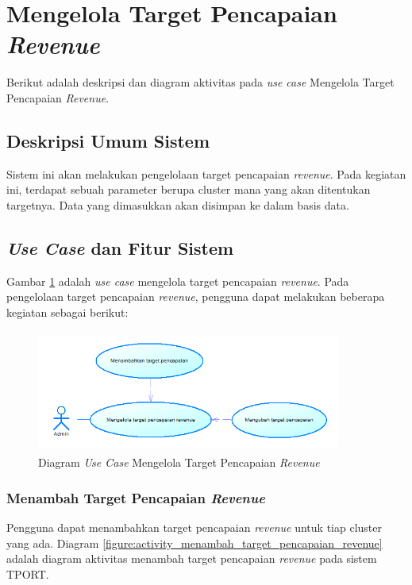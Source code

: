 \section{Mengelola Target Pencapaian \textit{Revenue}}
Berikut adalah deskripsi dan diagram aktivitas pada \textit{use case} Mengelola Target Pencapaian \textit{Revenue}.
\subsection{Deskripsi Umum Sistem}
\tab Sistem ini akan melakukan pengelolaan target pencapaian \textit{revenue}. Pada kegiatan ini, terdapat sebuah parameter berupa cluster mana yang akan ditentukan targetnya. Data yang dimasukkan akan disimpan ke dalam basis data.
\subsection{\textit{Use Case} dan Fitur Sistem}
Gambar \ref{figure:use_case_mengelola_target_pencapaian} adalah \textit{use case} mengelola target pencapaian \textit{revenue}. Pada pengelolaan target pencapaian \textit{revenue}, pengguna dapat melakukan beberapa kegiatan sebagai berikut:

	\begin{figure}[h]
		\centerline {\includegraphics[width=10cm,height=4cm]{bab4/use_case_mengelola_target_pencapaian_revenue.png}}
		\caption{Diagram \textit{Use Case} Mengelola Target Pencapaian \textit{Revenue}}
		\label{figure:use_case_mengelola_target_pencapaian}
	\end{figure}

	\subsubsection{Menambah Target Pencapaian \textit{Revenue}}
	Pengguna dapat menambahkan target pencapaian \textit{revenue} untuk tiap cluster yang ada. Diagram \ref{figure:activity_menambah_target_pencapaian_revenue} adalah diagram aktivitas menambah target pencapaian \textit{revenue} pada sistem TPORT.
	
